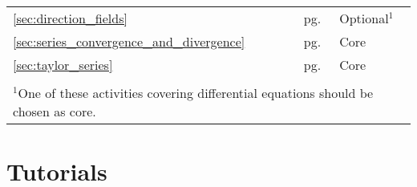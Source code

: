 \documentclass{tufte-book}
\begin{document}
\begin{table}[h]
\begin{tabular}{lll}
\ref{sec:direction_fields}
\nameref{sec:direction_fields}								& pg. \pageref{sec:direction_fields}							& Optional$^1$\\
\ref{sec:series_convergence_and_divergence}
\nameref{sec:series_convergence_and_divergence}				& pg. \pageref{sec:series_convergence_and_divergence}			& Core\\
\ref{sec:taylor_series}
\nameref{sec:taylor_series}									& pg. \pageref{sec:taylor_series}								& Core\\
\\
\multicolumn{3}{l}{$^1$One of these activities covering differential equations should be chosen as core.}
\end{tabular}
\end{table}














	



%




\part{Tutorials}
\label{pt:Tutorials}

\setcounter{chapter}{0}
\renewcommand{\thechapter}{\Alph{chapter}}
\renewcommand{\theHchapter}{otherchapter\thechapter}
\end{document}
